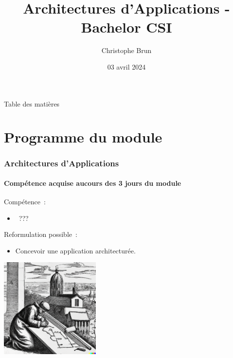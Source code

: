 \documentclass{beamer}
\title{Architectures d’Applications - Bachelor CSI}
\author{Christophe Brun}
\institute{Campus Saint-Michel IT}
\date{03 avril 2024}
\begin{document}
    \begin{frame}
        \transdissolve
        \titlepage
    \end{frame}

    \begin{frame}{Table des matières}
        \tableofcontents
    \end{frame}


    \section{Programme du module}\label{sec:programme-du-module}
    \begin{frame}
        \frametitle{Architectures d’Applications}
        \framesubtitle{Compétence acquise aucours des 3 jours du module}
        \transdissolve
        Compétence~:
        \begin{itemize}
            \item {}~???
        \end{itemize}
        \pause
        \bigbreak
        Reformulation possible~:
        \begin{itemize}
            \item Concevoir une application architecturée.
        \end{itemize}
        \centering
        \includegraphics[width=5cm]{image/engraving-of-a-monk-drawing-a-cathedral}
    \end{frame}
\end{document}
